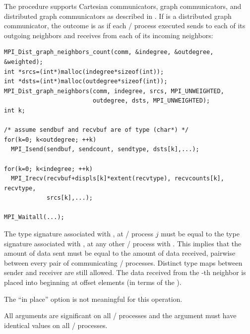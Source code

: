 The  procedure supports Cartesian communicators, graph communicators, and
distributed graph communicators as described
in .
If  is a distributed graph communicator, the outcome is as if each
\MPI/ process executed sends to each of its outgoing neighbors and receives from
each of its incoming neighbors:

\begin{lstlisting}[language={[MPI]C}]
MPI_Dist_graph_neighbors_count(comm, &indegree, &outdegree, &weighted);
int *srcs=(int*)malloc(indegree*sizeof(int));
int *dsts=(int*)malloc(outdegree*sizeof(int));
MPI_Dist_graph_neighbors(comm, indegree, srcs, MPI_UNWEIGHTED,
                         outdegree, dsts, MPI_UNWEIGHTED);
int k;

/* assume sendbuf and recvbuf are of type (char*) */
for(k=0; k<outdegree; ++k) 
  MPI_Isend(sendbuf, sendcount, sendtype, dsts[k],...); 

for(k=0; k<indegree; ++k) 
  MPI_Irecv(recvbuf+displs[k]*extent(recvtype), recvcounts[k], recvtype,
            srcs[k],...); 

MPI_Waitall(...);
\end{lstlisting}

The type signature associated with ,  at
\MPI/ process $j$ must be equal to the type signature associated with
\mpicode{[l]},  at any other \MPI/ process
with .
This implies that the amount of data sent must be equal to the
amount of data received, pairwise between every pair of
communicating \MPI/ processes.
Distinct type maps between sender and receiver are still allowed.
The data received from the -th neighbor is placed into
 beginning at offset \mpicode{[l]}
elements (in terms of the ). 

The ``in place'' option is not meaningful for this operation.

All arguments are significant on all \MPI/ processes and the argument
 must have identical values on all \MPI/ processes.


